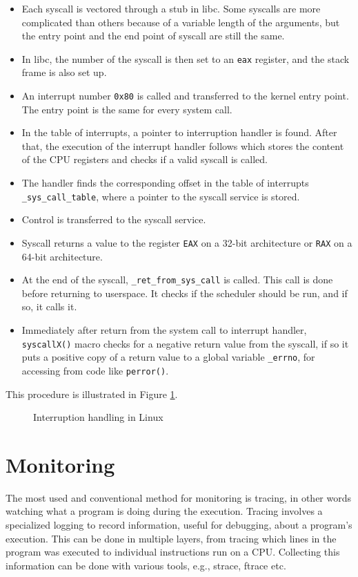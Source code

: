 \begin{itemize}
	\item Each syscall is vectored through a stub in libc.
    	  Some syscalls are more complicated than others because of a variable length of the arguments, but the entry point and the end point of syscall are still the same.
	\item In libc, the number of the syscall is then set to an \texttt{eax} register, and the stack frame is also set up.
	\item An interrupt number \texttt{0x80} is called and transferred to the kernel entry point.
    	  The entry point is the same for every system call.
	\item In the table of interrupts, a pointer to interruption handler is found.
    	  After that, the execution of the interrupt handler follows which stores the content of the CPU registers and checks if a valid syscall is called.
	\item The handler finds the corresponding offset in the table of interrupts \texttt{\_sys\_call\_table}, where a pointer to the syscall service is stored.
	\item Control is transferred to the syscall service.
	\item Syscall returns a value to the register \texttt{EAX} on a 32-bit architecture or \texttt{RAX} on a 64-bit architecture.
	\item At the end of the syscall, \texttt{\_ret\_from\_sys\_call\(\)} is called.
    	  This call is done before returning to userspace.
          It checks if the scheduler should be run, and if so, it calls it.
	\item Immediately after return from the system call to interrupt handler, \texttt{syscallX()} macro checks for a negative return value from the syscall, if so it puts a positive copy of a return value to a global variable \texttt{\_errno}, for accessing from code like \texttt{perror()}.
\end{itemize}

This procedure is illustrated in Figure \ref{fig:tikz:int_handling}. \cite{Silberschatz2013}

\begin{figure}[]
  \centering
  
  \caption{Interruption handling in Linux}
  \label{fig:tikz:int_handling}
\end{figure}


\section{Monitoring}
The most used and conventional method for monitoring is tracing, in other words watching what a program is doing during the execution.
Tracing involves a specialized logging to record information, useful for debugging, about a program's execution.
This can be done in multiple layers, from tracing which lines in the program was executed to individual instructions run on a CPU.
Collecting this information can be done with various tools, e.g., strace, ftrace etc.

